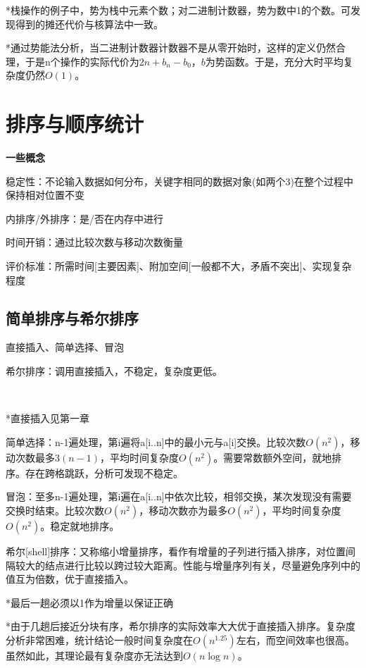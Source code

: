 \documentclass[a4paper,UTF8,fontset=windows]{ctexart}
\begin{document}
*\hspace{0em}栈操作的例子中，势为栈中元素个数；对二进制计数器，势为数中1的个数。可发现得到的摊还代价与核算法中一致。

*\hspace{0em}通过势能法分析，当二进制计数器计数器不是从零开始时，这样的定义仍然合理，于是n个操作的实际代价为$2n+b_n-b_0$，$b$为势函数。于是，充分大时平均复杂度仍然$O(1)$。

\section{排序与顺序统计}
\textbf{一些概念}

稳定性：不论输入数据如何分布，关键字相同的数据对象(如两个3)在整个过程中保持相对位置不变

内排序/外排序：是/否在内存中进行

时间开销：通过比较次数与移动次数衡量

评价标准：所需时间[主要因素]、附加空间[一般都不大，矛盾不突出]、实现复杂程度

\subsection{简单排序与希尔排序}
直接插入、简单选择、冒泡

希尔排序：调用直接插入，不稳定，复杂度更低。

\

*\hspace{0em}直接插入见第一章

简单选择：n-1遍处理，第i遍将a[i..n]中的最小元与a[i]交换。比较次数$O(n^2)$，移动次数最多$3(n-1)$，平均时间复杂度$O(n^2)$。需要常数额外空间，就地排序。存在跨格跳跃，分析可发现不稳定。

冒泡：至多n-1遍处理，第i遍在a[i..n]中依次比较，相邻交换，某次发现没有需要交换时结束。比较次数$O(n^2)$，移动次数亦为最多$O(n^2)$，平均时间复杂度$O(n^2)$。稳定就地排序。

希尔[shell]排序：又称缩小增量排序，看作有增量的子列进行插入排序，对位置间隔较大的结点进行比较以跨过较大距离。性能与增量序列有关，尽量避免序列中的值互为倍数，优于直接插入。

*\hspace{0em}最后一趟必须以1作为增量以保证正确

*\hspace{0em}由于几趟后接近分块有序，希尔排序的实际效率大大优于直接插入排序。复杂度分析非常困难，统计结论一般时间复杂度在$O(n^{1.25})$左右，而空间效率也很高。虽然如此，其理论最有复杂度亦无法达到$O(n\log n)$。
\end{document}
